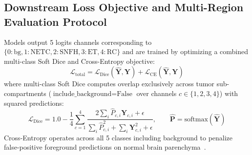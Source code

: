 \documentclass{article}
\begin{document}
\subsection{Downstream Loss Objective and Multi-Region Evaluation Protocol}
\label{sec:loss_and_metrics}

Models output 5 logits channels corresponding to $\{0:\text{bg}, 1:\text{NETC}, 2:\text{SNFH}, 3:\text{ET}, 4:\text{RC}\}$ and are trained by optimizing a combined multi-class Soft Dice and Cross-Entropy objective:
\begin{equation}
    \mathcal{L}_{\text{total}} = \mathcal{L}_{\text{Dice}}(\hat{\mathbf{Y}}, \mathbf{Y}) + \mathcal{L}_{\text{CE}}(\hat{\mathbf{Y}}, \mathbf{Y})
\end{equation}
where multi-class Soft Dice computes overlap exclusively across tumor sub-compartments ($\text{include\_background}=\text{False}$ over channels $c \in \{1,2,3,4\}$) with squared predictions:
\begin{equation}
    \mathcal{L}_{\text{Dice}} = 1.0 - \frac{1}{4}\sum_{c=1}^4 \frac{2 \sum_i \hat{P}_{c, i} \mathbf{Y}_{c, i} + \epsilon}{\sum_i \hat{P}_{c, i}^2 + \sum_i \mathbf{Y}_{c, i}^2 + \epsilon}, \qquad \hat{\mathbf{P}} = \text{softmax}(\hat{\mathbf{Y}})
\end{equation}
Cross-Entropy operates across all 5 classes including background to penalize false-positive foreground predictions on normal brain parenchyma~\citep{isensee2021nnunet}.
\end{document}
